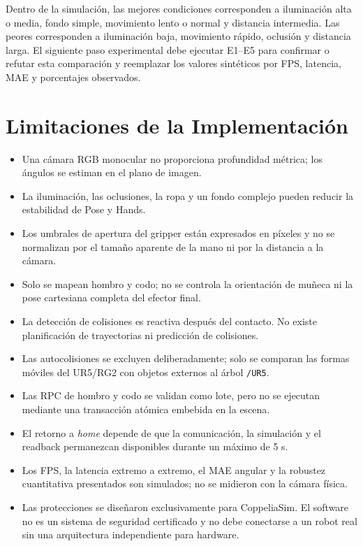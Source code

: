 Dentro de la simulación, las mejores condiciones corresponden a iluminación
alta o media, fondo simple, movimiento lento o normal y distancia intermedia.
Las peores corresponden a iluminación baja, movimiento rápido, oclusión y
distancia larga. El siguiente paso experimental debe ejecutar E1--E5 para
confirmar o refutar esta comparación y reemplazar los valores sintéticos por
FPS, latencia, MAE y porcentajes observados.

\section{Limitaciones de la Implementación}
\label{sec:limitaciones_implementacion}

\begin{itemize}
    \item Una cámara RGB monocular no proporciona profundidad métrica; los
    ángulos se estiman en el plano de imagen.
    \item La iluminación, las oclusiones, la ropa y un fondo complejo pueden
    reducir la estabilidad de Pose y Hands.
    \item Los umbrales de apertura del gripper están expresados en píxeles y no
    se normalizan por el tamaño aparente de la mano ni por la distancia a la
    cámara.
    \item Solo se mapean hombro y codo; no se controla la orientación de muñeca
    ni la pose cartesiana completa del efector final.
    \item La detección de colisiones es reactiva después del contacto. No existe
    planificación de trayectorias ni predicción de colisiones.
    \item Las autocolisiones se excluyen deliberadamente; solo se comparan las
    formas móviles del UR5/RG2 con objetos externos al árbol \texttt{/UR5}.
    \item Las RPC de hombro y codo se validan como lote, pero no se ejecutan
    mediante una transacción atómica embebida en la escena.
    \item El retorno a \textit{home} depende de que la comunicación, la
    simulación y el readback permanezcan disponibles durante un máximo de 5 s.
    \item Los FPS, la latencia extremo a extremo, el MAE angular y la robustez
    cuantitativa presentados son simulados; no se midieron con la cámara física.
    \item Las protecciones se diseñaron exclusivamente para CoppeliaSim. El
    software no es un sistema de seguridad certificado y no debe conectarse a
    un robot real sin una arquitectura independiente para hardware.
\end{itemize}
